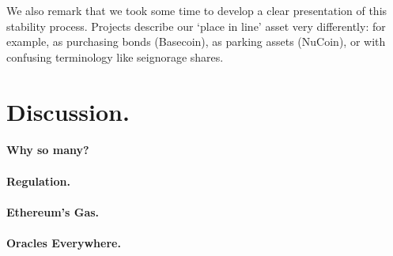 We also remark that we took some time to develop a clear presentation of this stability process. Projects describe our `place in line' asset very differently: for example, as purchasing bonds (Basecoin), as parking assets (NuCoin), or with confusing terminology like seignorage shares. %

\section{Discussion.} 

\paragraph{Why so many?}


\paragraph{Regulation.}

\paragraph{Ethereum's Gas.}

\paragraph{Oracles Everywhere.} 

